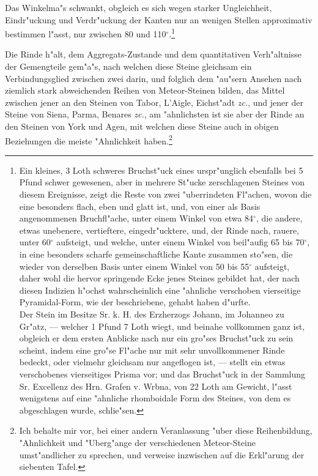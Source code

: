 \documentclass[a4paper, 11pt, oneside, german]{article}
\begin{document}
Das Winkelma"s schwankt, obgleich es sich wegen starker Ungleichheit, Eindr"uckung und Verdr"uckung der Kanten nur an wenigen Stellen approximativ bestimmen l"asst, nur zwischen 80 und 110$^{\circ}$.\footnote{Ein kleines, 3 Loth schweres Bruchst"uck eines urspr"unglich ebenfalls bei 5 Pfund schwer gewesenen, aber in mehrere St"ucke zerschlagenen Steines von diesem Ereignisse, zeigt die Reste von zwei "uberrindeten Fl"achen, wovon die eine besonders flach, eben und glatt ist, und, von einer als Basis angenommenen Bruchfl"ache, unter einem Winkel von etwa 84$^{\circ}$, die andere, etwas unebenere, vertieftere, eingedr"ucktere, und, der Rinde nach, rauere, unter 60$^{\circ}$ aufsteigt, und welche, unter einem Winkel von beil"aufig 65 bis 70$^{\circ}$, in eine besonders scharfe gemeinschaftliche Kante zusammen sto"sen, die wieder von derselben Basis unter einem Winkel von 50 bis 55$^{\circ}$ aufsteigt, daher wohl die hervor springende Ecke jenes Steines gebildet hat, der nach diesen Indizien h"ochst wahrscheinlich eine "ahnliche verschoben vierseitige Pyramidal-Form, wie der beschriebene, gehabt haben d"urfte.\\
\hspace*{6mm}Der Stein im Besitze Sr. k. H. des Erzherzogs Johann, im Johanneo zu Gr"atz, --- welcher 1 Pfund 7 Loth wiegt, und beinahe vollkommen ganz ist, obgleich er dem ersten Anblicke nach nur ein gro"ses Bruchst"uck zu sein scheint, indem eine gro"se Fl"ache nur mit sehr unvollkommener Rinde bedeckt, oder vielmehr gleichsam nur angeflogen ist, --- stellt ein etwas verschobenes vierseitiges Prisma vor; und das Bruchst"uck in der Sammlung Sr. Excellenz des Hrn. Grafen v. Wrbna, von 22 Loth am Gewicht, l"asst wenigstens auf eine "ahnliche rhomboidale Form des Steines, von dem es abgeschlagen wurde, schlie"sen.}

Die Rinde h"alt, dem Aggregats-Zustande und dem quantitativen Verh"altnisse der Gemengteile gem"a"s, nach welchen diese Steine gleichsam ein Verbindungsglied zwischen zwei darin, und folglich dem "au"sern Ansehen nach ziemlich stark abweichenden Reihen von Meteor-Steinen bilden, das Mittel zwischen jener an den Steinen von Tabor, L'Aigle, Eichst"adt \emph{zc.}, und jener der Steine von Siena, Parma, Benares \emph{zc.}, am "ahnlichsten ist sie aber der Rinde an den Steinen von York und Agen, mit welchen diese Steine auch in obigen Beziehungen die meiste "Ahnlichkeit haben.\footnote{Ich behalte mir vor, bei einer andern Veranlassung "uber diese Reihenbildung, "Ahnlichkeit und "Uberg"ange der verschiedenen Meteor-Steine umst"andlicher zu sprechen, und verweise inzwischen auf die Erkl"arung der siebenten Tafel.}
\end{document}
